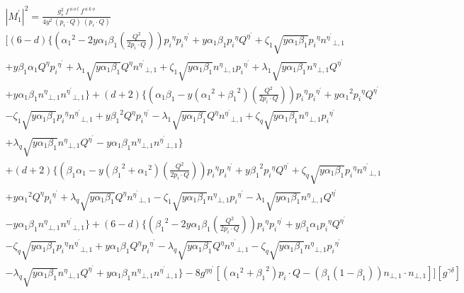 \begin{equation}
\begin{split}
{|{M}^{\prime}_1|}^2 =\frac{g_s^2 \:f^{\:a\:o\:l}\: f^{\:a\:k\:o}}{4y^2\:(p_i\cdot Q) \:(p_i\cdot Q)} \\
[(6-d)\lbrace({\alpha_1}^2 -2y\alpha_1 \beta_1(\frac{Q^2}{2p_i \cdot Q})) {p_i}^{\eta}{p_i}^{{\eta}^{\prime}}+y\alpha_1\beta_1 {p_i}^{\eta}{Q}^{{\eta}^{\prime}}+\zeta_1\sqrt{y\alpha_1\beta_1}{p_i}^{\eta}{n^{{\eta}^{\prime}}}_{\bot,1}\\
+y\beta_1\alpha_1  {Q}^{\eta}{p_i}^{{\eta}^{\prime}}+\lambda_1\sqrt{y\alpha_1\beta_1}{Q}^{\eta}{n^{{\eta}^{\prime}}}_{\bot,1}
+\zeta_1\sqrt{y\alpha_1\beta_1} {n^{{\eta}}}_{\bot,1}{p_i}^{{\eta}^{\prime}}+\lambda_1\sqrt{y\alpha_1\beta_1}{n^{{\eta}}}_{\bot,1}{Q}^{{\eta}^{\prime}}\\+y\alpha_1\beta_1{n^{{\eta}}}_{\bot,1}{n^{{\eta}^{\prime}}}_{\bot,1}\rbrace
+(d+2)\lbrace(\alpha_1\beta_1-y({\alpha_1}^2+{\beta_1}^2) (\frac{Q^2}{2p_i \cdot Q})) {p_i}^{\eta}{p_i}^{{\eta}^{\prime}}+y{\alpha_1}^2{p_i}^{\eta}{Q}^{{\eta}^{\prime}}\\-\zeta_1\sqrt{y\alpha_1\beta_1}{p_i}^{\eta}{n^{{\eta}^{\prime}}}_{\bot,1}
+y{\beta_1}^2 {Q}^{\eta}{p_i}^{{\eta}^{\prime}}-\lambda_1\sqrt{y\alpha_1\beta_1}{Q}^{\eta}{n^{{\eta}^{\prime}}}_{\bot,1}
+\zeta_q\sqrt{y\alpha_1\beta_1} {n^{{\eta}}}_{\bot,1}{p_i}^{{\eta}^{\prime}}\\+\lambda_q\sqrt{y\alpha_1\beta_1}{n^{{\eta}}}_{\bot,1}{Q}^{{\eta}^{\prime}}-y\alpha_1\beta_1{n^{{\eta}}}_{\bot,1}{n^{{\eta}^{\prime}}}_{\bot,1}\rbrace\\
+(d+2)\lbrace(\beta_1\alpha_1-y({\beta_1}^2+{\alpha_1}^2)(\frac{Q^2}{2p_i \cdot Q})) {p_i}^{\eta}{p_i}^{{\eta}^{\prime}}+y{\beta_1}^2{p_i}^{\eta}{Q}^{{\eta}^{\prime}}+\zeta_q\sqrt{y\alpha_1\beta_1}{p_i}^{\eta}{n^{{\eta}^{\prime}}}_{\bot,1}\\
+y{\alpha_1}^2 {Q}^{\eta}{p_i}^{{\eta}^{\prime}}+\lambda_q\sqrt{y\alpha_1\beta_1}{Q}^{\eta}{n^{{\eta}^{\prime}}}_{\bot,1}
-\zeta_1\sqrt{y\alpha_1\beta_1} {n^{{\eta}}}_{\bot,1}{p_i}^{{\eta}^{\prime}}-\lambda_1\sqrt{y\alpha_1\beta_1}{n^{{\eta}}}_{\bot,1}{Q}^{{\eta}^{\prime}}\\-y\alpha_1\beta_1{n^{{\eta}}}_{\bot,1}{n^{{\eta}^{\prime}}}_{\bot,1}\rbrace
+(6-d)\lbrace({\beta_1}^2 -2y\alpha_1\beta_1 (\frac{Q^2}{2p_i \cdot Q})) {p_i}^{\eta}{p_i}^{{\eta}^{\prime}}+y\beta_1\alpha_1 {p_i}^{\eta}{Q}^{{\eta}^{\prime}}\\-\zeta_q\sqrt{y\alpha_1\beta_1}{p_i}^{\eta}{n^{{\eta}^{\prime}}}_{\bot,1}
+y\alpha_1\beta_1 {Q}^{\eta}{p_i}^{{\eta}^{\prime}}-\lambda_q\sqrt{y\alpha_1\beta_1}{Q}^{\eta}{n^{{\eta}^{\prime}}}_{\bot,1}
-\zeta_q\sqrt{y\alpha_1\beta_1} {n^{{\eta}}}_{\bot,1}{p_i}^{{\eta}^{\prime}}\\-\lambda_q\sqrt{y\alpha_1\beta_1}{n^{{\eta}}}_{\bot,1}{Q}^{{\eta}^{\prime}}+y\alpha_1\beta_1{n^{{\eta}}}_{\bot,1}{n^{{\eta}^{\prime}}}_{\bot,1}\rbrace-8g^{{\eta}{{\eta}^{\prime}}}[({\alpha_1}^2+{\beta_1}^2) p_i \cdot Q - ({\beta_1}(1-\beta_1)){n}_{\bot,1}\cdot{n}_{\bot,1}]][g^{{\gamma}{{\delta}}}]
\end{split}
\end{equation}


